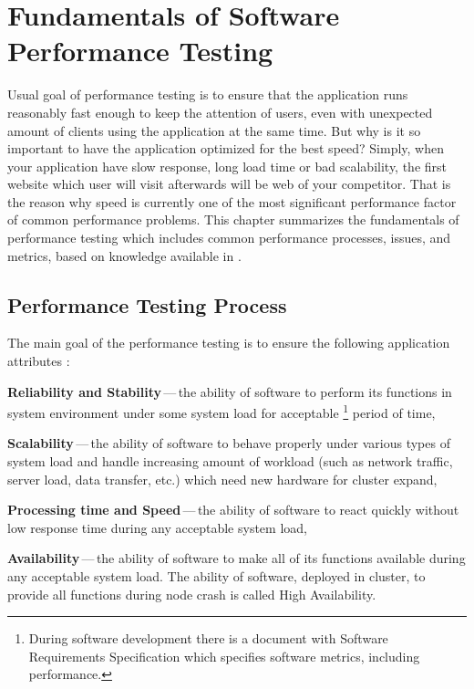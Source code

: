
\chapter{Fundamentals of Software Performance Testing}
\label{Fundamentals of Software Performance Testing}
Usual goal of performance testing is to ensure that the application runs reasonably fast enough to keep the attention of users, even with unexpected amount of clients using the application at the same time. But why is it so important to have the application optimized for the best speed? Simply, when your application have slow response, long load time or bad scalability, the first website which user will visit afterwards will be web of your competitor. That is the reason why speed is currently one of the most significant performance factor of common performance problems. This chapter summarizes the fundamentals of performance testing which includes common performance processes, issues, and metrics, based on knowledge available in \cite{Molyneaux:TAoAPT, Kurkova:Thesis:2017, DIN:PHD, ISTQB}.


\section{Performance Testing Process}
\label{Performance Testing Process}
The main goal of the performance testing is to ensure the following application attributes \cite{GAO:MEASURING}:

\begin{description}
	\setlength\itemsep{0em}
	\item \textbf{Reliability and Stability}\,---\,the ability of software to perform its functions in system environment under some system load for acceptable \footnote{During software development there is a document with Software Requirements Specification which specifies software metrics, including performance.} period of time,
	\item \textbf{Scalability}\,---\,the ability of software to behave properly under various types of system load and handle increasing amount of workload (such as network traffic, server load, data transfer, etc.) which need new hardware for cluster expand,
	\item \textbf{Processing time and Speed}\,---\,the ability of software to react quickly without low response time during any acceptable system load,
	\item \textbf{Availability}\,---\,the ability of software to make all of its functions available during any acceptable system load. The ability of software, deployed in cluster, to provide all functions during node crash is called High Availability.
\end{description}

